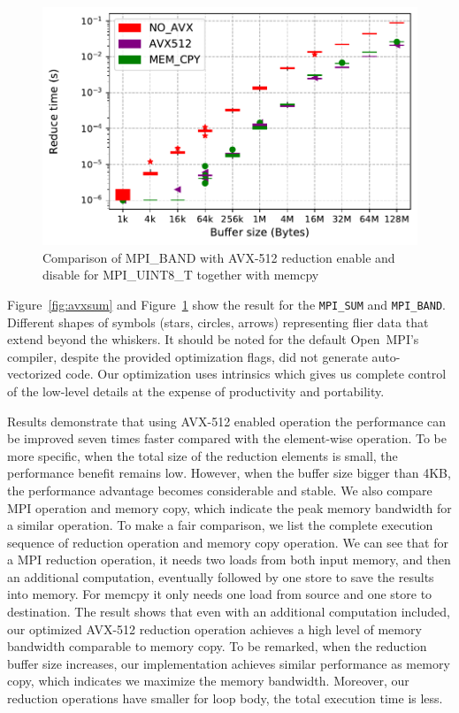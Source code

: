 \documentclass[5p,times,twocolumn]{elsarticle}
\newcommand{\mpifunc}[1]{\lstinline"MPI_#1"\xspace}
\newcommand{\ompi}[0]{Open~MPI\xspace}
\newcommand{\mpi}[0]{\textsc{MPI}\xspace}
\begin{document}
\begin{figure}[h]
    \centering
    \includegraphics[width=\linewidth]{avx_extend_more_prod_u8_1k-128M.pdf}
    \caption{Comparison of MPI\_BAND with AVX-512 reduction enable and disable for MPI\_UINT8\_T together with memcpy}
    \label{fig:avxband}
\end{figure}

Figure~\ref{fig:avxsum} and Figure~\ref{fig:avxband} show the result for the
\mpifunc{SUM} and \mpifunc{BAND}. Different shapes of symbols (stars, circles,
arrows) representing flier data that extend beyond the whiskers.
It should be noted for the default \ompi's compiler, despite the
provided optimization flags, did not generate auto-vectorized
code. Our optimization uses intrinsics which gives us complete
control of the low-level details at the expense of productivity and
portability.

Results demonstrate that using AVX-512 enabled operation the
performance can be improved seven times faster compared with the
element-wise operation.  To be more specific, when the total size of
the reduction elements is small, the performance benefit remains low.
%
However, when the buffer size bigger than 4KB, the performance
advantage becomes considerable and stable.  We also compare MPI
operation and memory copy, which indicate the peak memory bandwidth
for a similar operation.  To make a fair comparison, we list the
complete execution sequence of reduction operation and memory copy
operation.  We can see that for a \mpi reduction operation, it needs
two loads from both input memory, and then an additional
computation, eventually followed by one store to save the results into
memory. For memcpy it only needs one load from source and one store to
destination.  The result shows that even with an additional
computation included, our optimized AVX-512 reduction operation
achieves a high level of memory bandwidth comparable to
memory copy.  To be remarked, when the reduction buffer size increases,
our implementation achieves similar performance as
memory copy, which indicates we maximize the memory bandwidth. Moreover, our reduction
operations have smaller for loop body, the total execution time is less.
\end{document}
